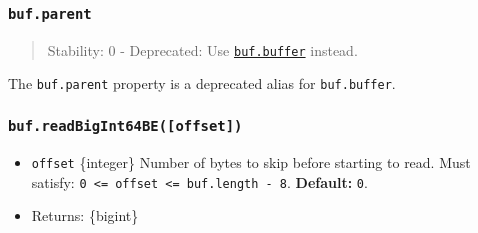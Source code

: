 \begin{Shaded}
\begin{Highlighting}[]
\NormalTok{ \{ }\NormalTok{ \} }\OperatorTok{=} \NormalTok{(}\NormalTok{)}\OperatorTok{;}


\OperatorTok{=} \NormalTok{(}\NormalTok{)}\OperatorTok{;}

\NormalTok{)}\OperatorTok{;}

\NormalTok{(}\OperatorTok{,} \OperatorTok{,} \NormalTok{)}\OperatorTok{;}

\NormalTok{)}\OperatorTok{;}
\end{Highlighting}
\end{Shaded}

\subsubsection{\texorpdfstring{\texttt{buf.parent}}{buf.parent}}\label{buf.parent}

\begin{quote}
Stability: 0 - Deprecated: Use \hyperref[bufbuffer]{\texttt{buf.buffer}}
instead.
\end{quote}

The \texttt{buf.parent} property is a deprecated alias for
\texttt{buf.buffer}.

\subsubsection{\texorpdfstring{\texttt{buf.readBigInt64BE({[}offset{]})}}{buf.readBigInt64BE({[}offset{]})}}\label{buf.readbigint64beoffset}

\begin{itemize}
\tightlist
\item
  \texttt{offset} \{integer\} Number of bytes to skip before starting to
  read. Must satisfy:
  \texttt{0\ \textless{}=\ offset\ \textless{}=\ buf.length\ -\ 8}.
  \textbf{Default:} \texttt{0}.
\item
  Returns: \{bigint\}
\end{itemize}

